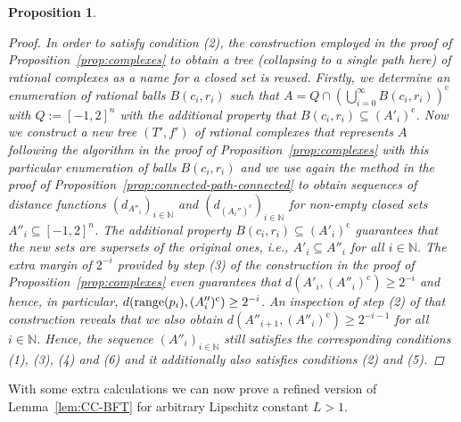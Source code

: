 \documentclass[a4paper]{amsart}
\def\IN{{\mathbb{N}}}
\def\In{\subseteq}
\def\range{{\rm range}}
\def\cc{\mathrm c}
\newtheorem{proposition}[theorem]{Proposition}
\theoremstyle{definition}
\begin{document}
\begin{proposition}
\begin{proof}
In order to satisfy condition (2), the construction employed in the proof of Proposition~\ref{prop:complexes} to obtain a tree (collapsing to a single path here) of rational complexes as a name for a closed set is reused. 
Firstly, we determine an enumeration of rational balls $B(c_i,r_i)$ such that $A=Q\cap(\bigcup_{i=0}^\infty B(c_i,r_i))^\cc$ with $Q:=[-1,2]^n$
with the additional property that $B(c_i,r_i)\In (A'_i)^\cc$. Now we construct a new tree $(T',f')$ of rational complexes that represents $A$ following the algorithm 
in the proof of Proposition~\ref{prop:complexes} with this particular enumeration of balls $B(c_i,r_i)$ and we use again the method in the proof of  Proposition~\ref{prop:connected-path-connected}
to obtain sequences of distance functions $(d_{A''_i})_{i \in \IN}$ and $(d_{(A_i'')^\cc})_{i \in\IN}$
for non-empty closed sets $A''_i \subseteq [-1, 2]^n$.
The additional property $B(c_i,r_i)\In (A'_i)^\cc$ guarantees that the new sets are supersets of the original ones, 
i.e., $A'_i\In A''_i$ for all $i\in\IN$. The extra margin of $2^{-i}$ provided by step (3) of the construction in the proof of Proposition~\ref{prop:complexes}
even guarantees that $d(A'_i,(A''_i)^\cc)\geq2^{-i}$ and hence, in particular, $d(\range(p_i), (A''_i)^\cc) \geq 2^{-i}$. 
An inspection of step (2) of that construction reveals that we
also obtain $d(A''_{i+1},(A''_i)^\cc)\geq2^{-i-1}$ for all $i\in\IN$.
Hence, the sequence $(A''_i)_{i\in\IN}$ still satisfies the corresponding 
conditions (1), (3), (4) and (6) and it additionally also satisfies conditions (2) and (5).
\end{proof}
\end{proposition}

With some extra calculations we can now prove a refined version of Lemma~\ref{lem:CC-BFT}
for arbitrary Lipschitz constant $L>1$.	
\end{document}
